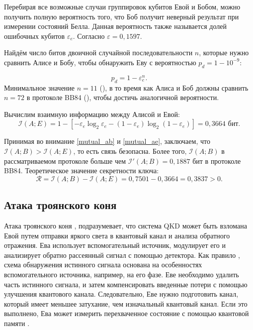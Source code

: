\documentclass[a4paper,11pt]{article}
\begin{document}
Перебирая все возможные случаи группировок кубитов Евой и Бобом, можно получить полную вероятность того, что Боб получит неверный результат при измерении состояний Белла. Данная вероятность также называется долей ошибочных кубитов $\varepsilon_e$. Согласно \cite{base} $\varepsilon = 0,1597$.

Найдём число битов двоичной случайной последовательности $n$, которые нужно сравнить Алисе и Бобу, чтобы обнаружить Еву с вероятностью $p_d = 1 - 10^{-9}$:

\begin{equation*}
p_d = 1 - \varepsilon_e ^n.
\end{equation*}
Минимальное значение $n = 11$ (\cite{base}), в то время как Алиса и Боб должны сравнить $n = 72$ в протоколе BB84 (\cite{eleven}), чтобы достичь аналогичной вероятности. 

Вычислим взаимную информацию между Алисой и Евой:  
\begin{equation}\label{mutual_ae}
\mathcal{I}(A; E) = 1 - [- \varepsilon_e \log_2 \varepsilon_e -(1-\varepsilon_e)\log_2 (1-\varepsilon_e) ] = 0,3664 \text{ бит}.
\end{equation}

Принимая во внимание \eqref{mutual_ab} и \eqref{mutual_ae}, заключаем, что $\mathcal{I}(A; B) > \mathcal{I}(A; E)$, то есть связь безопасна. Более того, $\mathcal{I}(A; B)$ в рассматриваемом протоколе больше чем $\mathcal{I'} (A; B) = 0,1887$ бит в протоколе BB84.
Теоретическое значение секретности ключа:
\begin{equation*}
\mathcal{R} = \mathcal{I}(A; B) - \mathcal{I}(A; E) = 0,7501 - 0,3664 = 0,3837 > 0.
\end{equation*}


\subsection{Атака троянского коня}

Атака троянского коня \cite{trojan,trojan2, trojan4}, подразумевает, что система QKD может быть взломана Евой путем отправки яркого света в квантовый канал и анализа обратного отражения. Ева использует вспомогательный источник, модулирует его и анализирует обратно рассеянный сигнал с помощью детектора. Как правило \cite{trojan}, схема обнаружения истинного сигнала основана на особенностях вспомогательного источника, например, на его фазе. Еве необходимо удалить часть истинного сигнала, и затем компенсировать введенные потери с помощью улучшения квантового канала. Следовательно, Еве нужно подготовить канал, который имеет меньшее затухание, чем изначальный квантовый канал. Если это выполнено, Ева может измерить перехваченное состояние с помощью квантовой памяти \cite{base}.
\end{document}
